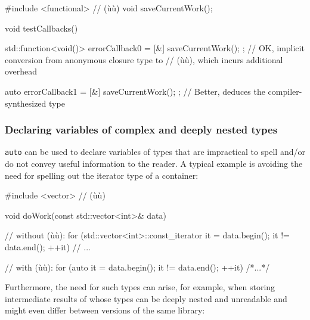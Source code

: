 \begin{emcppshiddenlisting}[emcppsbatch=e8]
#include <functional>      // (ù{}ù)
void saveCurrentWork();
\end{emcppshiddenlisting}
\begin{emcppslisting}[emcppsbatch=e8]
void testCallbacks()
{
    std::function<void()> errorCallback0 = [&]{ saveCurrentWork(); };
        // OK, implicit conversion from anonymous closure type to
        // (ù{}ù), which incurs additional overhead

    auto errorCallback1 = [&]{ saveCurrentWork(); };
        // Better, deduces the compiler-synthesized type
}
\end{emcppslisting}
    

\subsubsection[Declaring variables of complex and deeply nested types]{Declaring variables of complex and deeply nested types}\label{declaring-variables-of-complex-and-deeply-nested-types}

\lstinline!auto! can be used to declare variables of types that are impractical to spell and/or do not convey useful information to the reader.  A typical example is avoiding the
need for spelling out the iterator type of a container:

\begin{emcppshiddenlisting}[emcppsbatch=e9]
#include <vector>      // (ù{}ù)
\end{emcppshiddenlisting}
\begin{emcppslisting}[emcppsbatch=e9]
void doWork(const std::vector<int>& data)
{
    // without (ù{}ù):
    for (std::vector<int>::const_iterator it = data.begin();
         it != data.end();
         ++it) {
        // ...
    }

    // with (ù{}ù):
    for (auto it = data.begin(); it != data.end(); ++it) { /*...*/ }
}
\end{emcppslisting}
    
\noindent Furthermore, the need for such types can arise, for example, when
storing intermediate results of  whose types can
be deeply nested and unreadable and might even differ between versions of
the same library:

